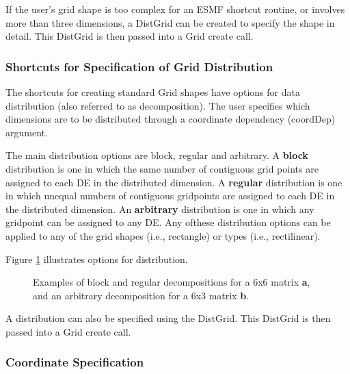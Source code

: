 If the user's grid shape is too complex for an ESMF shortcut routine,
or involves more than three dimensions, a DistGrid can be created
to specify the shape in detail.  This DistGrid is then passed
into a Grid create call.

\subsubsection{Shortcuts for Specification of Grid Distribution}\label{sec:desc:dist}

The shortcuts for creating standard Grid shapes have options
for data distribution (also referred to as decomposition).  The
user specifies which dimensions 
are to be distributed through a coordinate dependency (coordDep)
argument.

The main distribution options are block, regular and arbitrary.
A {\bf block} distribution is one in which the same number of
contiguous grid points are assigned to each DE in the
distributed dimension.  A {\bf regular} distribution is one in which
unequal numbers of contiguous gridpoints are assigned to each
DE in the distributed dimension.  An {\bf arbitrary} distribution is
one in which any gridpoint can be assigned to any DE.  Any ofthese
distribution options can be applied to any of the grid shapes (i.e.,
rectangle) or types (i.e., rectilinear).

Figure \ref{fig:GridDecomps} illustrates options for distribution.
\begin{figure}
\caption{Examples of block and regular decompositions for
a 6x6 matrix {\bf a}, and an arbitrary decomposition for a 6x3 matrix {\bf b}.}
\label{fig:GridDecomps}
\end{figure}

A distribution can also be specified using the DistGrid.  This
DistGrid is then passed into a Grid create call.

\subsubsection{Coordinate Specification}

